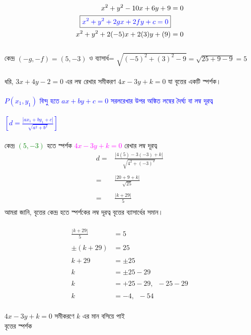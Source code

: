 \documentclass{article}
\begin{document}
	\\ 
	\begin{align*}
		x^2+y^2-10x+6y+9&=0\\
		\boxed{\textcolor{blue}{x^2+y^2+2gx+2fy+c=0}}&\\
		x^2+y^2+2(-5)x+2(3)y+(9)&=0
	\end{align*}
	\\
	কেন্দ্র 	$(-g,-f)=(5,-3)$ ও ব্যাসার্ধ= $\sqrt{(-5)^2+(3)^2-9}=\sqrt{25+9-9}=5$\\
	\\ 
	ধরি,  $3x+4y-2=0$ এর লম্ব রেখার সমীকরণ  $4x-3y+k=0$ যা বৃত্তের একটি স্পর্শক।\\
	\\  
	\textcolor{blue}{$P(x_1,y_1)$ বিন্দু হতে  $ax+by+c=0$ সরলরেখার উপর অঙ্কিত লম্বের দৈর্ঘ্য বা লম্ব দূরত্ব \\
		\\
		$\left[d=\frac{|ax_1+by_1+c|}{\sqrt{a^2+b^2}}\right]$}\\
	\\
	কেন্দ্র \textcolor{green}{$(5,-3)$} হতে স্পর্শক \textcolor{magenta}{$4x-3y+k=0$}  রেখার লম্ব দূরত্ব \\
	\begin{align*}
		d=	&\frac{|4(5)-3(-3)+k|}{\sqrt{4^2+(-3)^2}}\\
		\\
		=	&	\frac{|20+9+k|}{\sqrt{25}}\\
		\\
		=	&	\frac{|k+29|}{5}\\
	\end{align*}
	আমরা জানি, বৃত্তের কেন্দ্র হতে স্পর্শকের লম্ব দূরত্ব বৃত্তের ব্যাসার্ধের সমান। \\
	\\ 
	\begin{align*}
		\frac{|k+29|}{5}&=5\\
		\\
		\pm (k+29)&=25\\
		\\
		k+29&=\pm 25\\
		\\
		k&=\pm 25-29\\
		\\
		k&=+25-29,\,\,\,-25-29\\
		\\
		k&=-4,\,\,\,-54
	\end{align*}
	\\
	$4x-3y+k=0$ সমীকরণে $k$ এর মান বসিয়ে পাই \\ 
	বৃত্তের স্পর্শক \\ 
\end{document}
